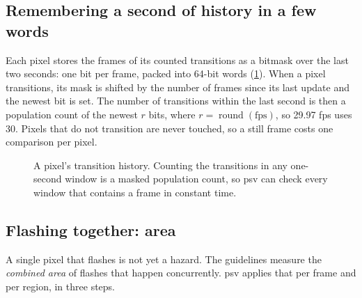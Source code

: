 \documentclass[11pt,a4paper]{article}
\newcommand{\psv}{\textsf{psv}}
\begin{document}
\subsection{Remembering a second of history in a few words}

Each pixel stores the frames of its counted transitions as a bitmask over the last two seconds: one bit per frame, packed into 64-bit words (\cref{fig:bits}). When a pixel transitions, its mask is shifted by the number of frames since its last update and the newest bit is set. The number of transitions within the last second is then a population count of the newest $r$ bits, where $r=\operatorname{round}(\text{fps})$, so 29.97 fps uses 30. Pixels that do not transition are never touched, so a still frame costs one comparison per pixel.

\begin{figure}[ht]
  \centering
  \caption{A pixel's transition history. Counting the transitions in any one-second window is a masked population count, so \psv{} can check every window that contains a frame in constant time.}
  \label{fig:bits}
\end{figure}

\subsection{Flashing together: area}

A single pixel that flashes is not yet a hazard. The guidelines measure the \emph{combined area} of flashes that happen concurrently. \psv{} applies that per frame and per region, in three steps.
\end{document}
